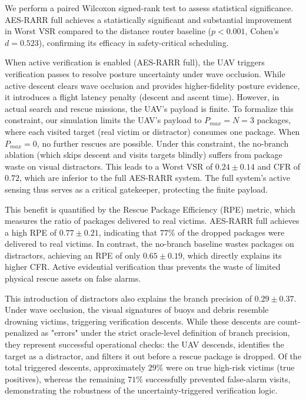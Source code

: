 \documentclass[runningheads]{llncs}
\newcommand{\aes}{AES-RARR}
\begin{document}
We perform a paired Wilcoxon signed-rank test to assess statistical significance. \aes{} full achieves a statistically significant and substantial improvement in Worst VSR compared to the distance router baseline ($p < 0.001$, Cohen's $d = 0.523$), confirming its efficacy in safety-critical scheduling.

When active verification is enabled (\aes{} full), the UAV triggers verification passes to resolve posture uncertainty under wave occlusion. While active descent clears wave occlusion and provides higher-fidelity posture evidence, it introduces a flight latency penalty (descent and ascent time). However, in actual search and rescue missions, the UAV's payload is finite. To formalize this constraint, our simulation limits the UAV's payload to $P_{max} = N = 3$ packages, where each visited target (real victim or distractor) consumes one package. When $P_{max} = 0$, no further rescues are possible. Under this constraint, the no-branch ablation (which skips descent and visits targets blindly) suffers from package waste on visual distractors. This leads to a Worst VSR of $0.24 \pm 0.14$ and CFR of $0.72$, which are inferior to the full \aes{} system. The full system's active sensing thus serves as a critical gatekeeper, protecting the finite payload.

This benefit is quantified by the Rescue Package Efficiency (RPE) metric, which measures the ratio of packages delivered to real victims. \aes{} full achieves a high RPE of $0.77 \pm 0.21$, indicating that $77\%$ of the dropped packages were delivered to real victims. In contrast, the no-branch baseline wastes packages on distractors, achieving an RPE of only $0.65 \pm 0.19$, which directly explains its higher CFR. Active evidential verification thus prevents the waste of limited physical rescue assets on false alarms.

This introduction of distractors also explains the branch precision of $0.29 \pm 0.37$. Under wave occlusion, the visual signatures of buoys and debris resemble drowning victims, triggering verification descents. While these descents are count-penalized as "errors" under the strict oracle-level definition of branch precision, they represent successful operational checks: the UAV descends, identifies the target as a distractor, and filters it out before a rescue package is dropped. Of the total triggered descents, approximately $29\%$ were on true high-risk victims (true positives), whereas the remaining $71\%$ successfully prevented false-alarm visits, demonstrating the robustness of the uncertainty-triggered verification logic.
\end{document}

